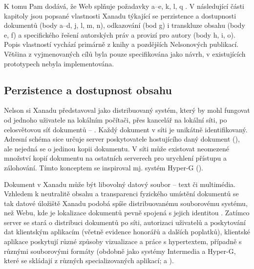 K tomu Pam dodává, že Web splňuje požadavky a--e, k, l, q \autocite[\pno~3a]{XanaFAQ}. %
V následující části kapitoly jsou popsané vlastnosti Xanadu týkající se perzistence a dostupnosti dokumentů (body a--d, j, l, m, n), odkazování (bod g) i transkluze obsahu (body e, f) a specifického řešení autorských práv a provizí pro autory (body h, i, o). Popis vlastností vychází primárně z knihy  \autocite{LitMachines} a pozdějších Nelsonových publikací. Většina z vyjmenovaných cílů byla pouze specifikována jako návrh, v existujících prototypech nebyla implementována.

\subsection{Perzistence a dostupnost obsahu}

Nelson si Xanadu představoval jako distribuovaný systém, který by mohl fungovat od jednoho uživatele na lokálním počítači, přes kancelář na lokální síti, po celosvětovou síť dokumentů --  \autocite[2/53]{LitMachines}. Každý dokument v síti je unikátně identifikovaný. Adresní schéma sice určuje server poskytovatele hostujícího daný dokument (), ale nejedná se o jedinou kopii dokumentu. V síti může existovat neomezené množství kopií dokumentu na ostatních serverech pro urychlení přístupu a zálohování. Tímto konceptem se inspiroval mj. systém Hyper-G ().

Dokument v Xanadu může být libovolný datový soubor -- text či multimédia. Vzhledem k neutralitě obsahu a transparenci fyzického umístění dokumentů se tak datové úložiště Xanadu podobá spíše distribuovanému souborovému systému, než Webu, kde je lokalizace dokumentů pevně spojená s jejich identitou \autocite[29]{Pam1995}. Zatímco server se stará o distribuci dokumentů po síti, autorizaci uživatelů a poskytování dat klientským aplikacím (včetně evidence honorářů a dalších poplatků), klientské aplikace poskytují různé způsoby vizualizace a práce s hypertextem, případně s různými souborovými formáty (obdobně jako systémy Intermedia a Hyper-G, které se skládají z různých specializovaných aplikací;  a \pageref{sec:hyperg}).

